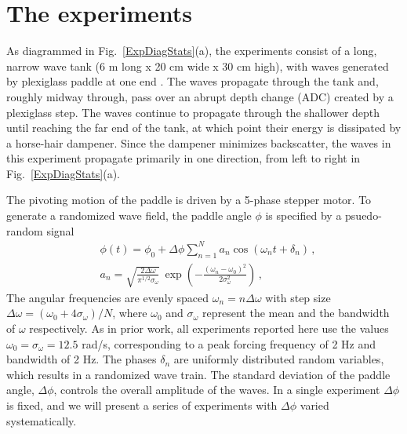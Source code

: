 \documentclass[11pt]{article}
\newcommand{\omavg}{\omega_0}
\newcommand{\omsig}{\sigma_{\omega}}
\newcommand{\Dphi}{\Delta \phi}
\begin{document}


\section{The experiments}
\label{experiments}

	As diagrammed in Fig.~\ref{ExpDiagStats}(a), the experiments consist of a long, narrow wave tank (6 m long x 20 cm wide x 30 cm high), with waves generated by plexiglass paddle at one end \cite{bolles2019}. The waves propagate through the tank and, roughly midway through, pass over an abrupt depth change (ADC) created by a plexiglass step. The waves continue to propagate through the shallower depth until reaching the far end of the tank, at which point their energy is dissipated by a horse-hair dampener. Since the dampener minimizes backscatter, the waves in this experiment propagate primarily in one direction, from left to right in Fig.~\ref{ExpDiagStats}(a). 

The pivoting motion of the paddle is driven by a 5-phase stepper motor. To generate a randomized wave field, the paddle angle $\phi$ is specified by a psuedo-random signal
\begin{align}
\label{PaddleAngle}
& \phi(t) = \phi_0 + \Dphi \sum_{n=1}^N a_n \cos(\omega_n t+\delta_n) \, , \\
\label{anEq}
& a_n = \sqrt{\frac{2 \Delta \omega}{\pi^{1/2} \omsig}} \, 
\exp \left( -\frac{(\omega_n - \omavg)^2}{2 \omsig^2} \right) \, ,
\end{align}
The angular frequencies are evenly spaced $\omega_n = n  \Delta \omega$ with step size $ \Delta \omega = (\omavg+4 \omsig)/N$, where $\omavg$ and $\omsig$ represent the mean and the bandwidth of $\omega$ respectively. As in prior work, all experiments reported here use the values $\omavg = \omsig = 12.5$ rad/s, corresponding to a peak forcing frequency of 2 Hz and bandwidth of 2 Hz. The phases $\delta_n$ are uniformly distributed random variables, which results in a randomized wave train. The standard deviation of the paddle angle, $\Dphi$, controls the overall amplitude of the waves. In a single experiment $\Dphi$ is fixed, and we will present a series of experiments with $\Dphi$ varied systematically. 
\end{document}
